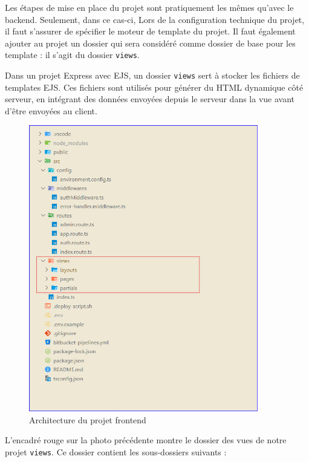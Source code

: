 {\vspace{0.35cm}

Les étapes de mise en place du projet sont pratiquement les mêmes qu'avec le backend. Seulement, dans ce cas-ci, Lors de la configuration technique du projet, il faut s'assurer de spécifier le moteur de template du projet. Il faut également ajouter au projet un dossier qui sera considéré comme dossier de base pour les template : il s'agit du dossier \verb|views|. 

\vspace{0.35cm} 
Dans un projet Express avec EJS, un dossier \verb|views| sert à stocker les fichiers de templates EJS. Ces fichiers sont utilisés pour générer du HTML dynamique côté serveur, en intégrant des données envoyées depuis le serveur dans la vue avant d'être envoyées au client.

\vspace{0.35cm}

\begin{figure}[H]
\begin{center}
\includegraphics[width=10cm]{assets/presentation/fixaars-front.png}
\end{center}
\caption{Architecture du projet frontend}
\end{figure}

L'encadré rouge sur la photo précédente montre le dossier des vues de notre projet \verb|views|. Ce dossier contient les sous-dossiers suivants : 

}
